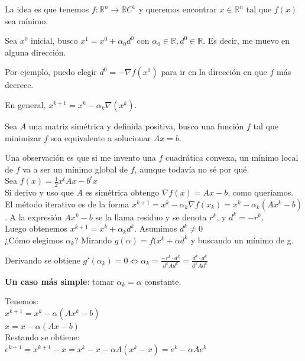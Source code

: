 \documentclass[10pt,a4paper,final]{report}
\begin{document}
La idea es que tenemos $f : \mathbb{R}^n \rightarrow \mathbb{R} C^1$ y queremos encontrar $x\in\mathbb{R}^n$ tal que $f(x)$ sea mínimo.

Sea $x^0$ inicial, busco $x^1 = x^0 + \alpha_0 d^0$ con $\alpha_0 \in\mathbb{R}, d^0 \in \mathbb{R}$. Es decir, me muevo en alguna dirección.

Por ejemplo, puedo elegir $d^0 = - \nabla f(x^0)$ para ir en la dirección en que $f$ más decrece.

En general, $x^{k+1} = x^k - \alpha_k \nabla(x^k)$.

Sea $A$ una matriz simétrica y definida positiva, busco una función $f$ tal que minimizar $f$ sea equivalente a solucionar $Ax=b$.

Una observación es que si me invento una $f$ cuadrática convexa, un mínimo local de $f$ va a ser un mínimo global de $f$, aunque todavía no sé por qué.\\

Sea $f(x) = \frac{1}{2} x^t A x - b^t x$\\

Si derivo y uso que $A$ es simétrica obtengo $\nabla f(x) = Ax -b$, como queríamos.\\

El método iterativo es de la forma $x^{k+1} = x^k - \alpha_k \nabla f(x_k) = x^k - \alpha_k(Ax^k-b)$. A la expresión $Ax^k-b$ se la llama residuo y se denota $r^k$, y $d^k = -r^k$. \\

Luego obtenemos $x^{k+1} = x^k + \alpha_k d^k$. Asumimos $d^k\neq0$\\

¿Cómo elegimos $\alpha_k$? Mirando $g(\alpha)=f(x^k + \alpha d^k$ y buscando un mínimo de g.

Derivando se obtiene $g'(\alpha_k) = 0 \Leftrightarrow \alpha_k = \frac{-r^k \cdot d^k}{d^k A d^k} = \frac{d^k \cdot d^k}{d^k A d^k}$

\textbf{Un caso más simple}: tomar $\alpha_k = \alpha$ constante.

Tenemos:\\

$x^{k+1}=x^k - \alpha(Ax^k-b)$\\
$x=x - \alpha(Ax-b)$\\

Restando se obtiene:\\

$e^{k+1} = x^{k+1} - x = x^k - x - \alpha A (x^k-x) = e^k - \alpha A e^k$ \\
\end{document}
